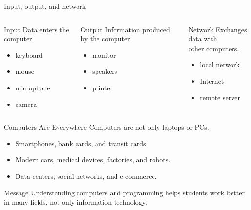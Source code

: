 \documentclass[aspectratio=169,10pt]{beamer}
\begin{document}
\begin{frame}{Input, output, and network}
\small
\begin{columns}[T,onlytextwidth]
\begin{block}{Input}
Data enters the computer.
\begin{itemize}
  \item keyboard
  \item mouse
  \item microphone
  \item camera
\end{itemize}
\end{block}

\begin{block}{Output}
Information produced by the computer.
\begin{itemize}
  \item monitor
  \item speakers
  \item printer
\end{itemize}
\end{block}

\begin{block}{Network}
Exchanges data with\\
other computers.
\begin{itemize}
  \item local network
  \item Internet
  \item remote server
\end{itemize}
\end{block}
\end{columns}
\end{frame}

\begin{frame}{Computers Are Everywhere}
Computers are not only laptops or PCs.
\begin{itemize}
  \item Smartphones, bank cards, and transit cards.
  \item Modern cars, medical devices, factories, and robots.
  \item Data centers, social networks, and e-commerce.
\end{itemize}

\begin{block}{Message}
\small Understanding computers and programming helps students work better\\
in many fields, not only information technology.
\end{block}
\end{frame}
\end{document}
